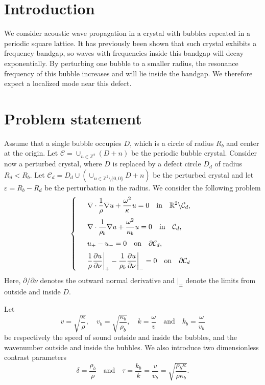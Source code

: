 \documentclass[a4paper]{article}
\author{Erik Orvehed Hiltunen}
\theoremstyle{definition}
\newcommand{\Z}{\mathbb{Z}}
\newcommand{\R}{\mathbb{R}}
\newcommand{\C}{\mathcal{C}}
\renewcommand{\epsilon}{\varepsilon}
\newcommand{\ds}{\displaystyle}
\def\nm{\noalign{\medskip}}
\begin{document}
\section{Introduction}
We consider acoustic wave propagation in a crystal with bubbles repeated in a periodic square lattice. It has previously been shown that such crystal exhibits a frequency bandgap, so waves with frequencies inside this bandgap will decay exponentially. By perturbing one bubble to a smaller radius, the resonance frequency of this bubble increases and will lie inside the bandgap. We therefore expect a localized mode near this defect.


\section{Problem statement}
Assume that a single bubble occupies $D$, which is a circle of radius $R_b$ and center at the origin. Let $\C = \cup_{n\in\Z^2}(D+n)$ be the periodic bubble crystal. Consider now a perturbed crystal, where $D$ is replaced by a defect circle $D_d$ of radius $R_d < R_b$. Let $\C_d = D_d \cup \left( \cup_{n\in\Z^2\setminus\{0,0\}} D+n \right)$ be the perturbed crystal and let $\epsilon = R_b-R_d$ be the perturbation in the radius. We consider the following problem
\begin{equation} \label{eq:scattering}
\left\{
\begin{array} {ll}
	&\ds \nabla \cdot \frac{1}{\rho} \nabla  u+ \frac{\omega^2}{\kappa} u  = 0 \quad \text{in} \quad \R^2 \backslash \C_d, \\
	\nm
	&\ds \nabla \cdot \frac{1}{\rho_b} \nabla  u+ \frac{\omega^2}{\kappa_b} u  = 0 \quad \text{in} \quad \C_d, \\
	\nm
	&\ds  u_{+} -u_{-}  =0   \quad \text{on} \quad \partial \C_d, \\
	\nm
	& \ds  \frac{1}{\rho} \frac{\partial u}{\partial \nu} \bigg|_{+} - \frac{1}{\rho_b} \frac{\partial u}{\partial \nu} \bigg|_{-} =0 \quad \text{on} \quad \partial \C_d
\end{array}
\right.
\end{equation}
Here, $\partial/\partial \nu$ denotes the outward normal derivative and $|_\pm$ denote the limits from outside and inside $D$.  

Let
\begin{equation*} %
v = \sqrt{\frac{\kappa}{\rho}}, \quad v_b = \sqrt{\frac{\kappa_b}{\rho_b}}, \quad k= \frac{\omega}{v} \quad \text{and} \quad k_b= \frac{\omega}{v_b}
\end{equation*}
be respectively the speed of sound outside and inside the bubbles, and the wavenumber outside and inside the bubbles. We also introduce two dimensionless contrast parameters
\begin{equation*} %
\delta = \frac{\rho_b}{\rho} \quad \text{and} \quad \tau= \frac{k_b}{k}= \frac{v}{v_b} =\sqrt{\frac{\rho_b \kappa}{\rho \kappa_b}}. 
\end{equation*}
\end{document}
